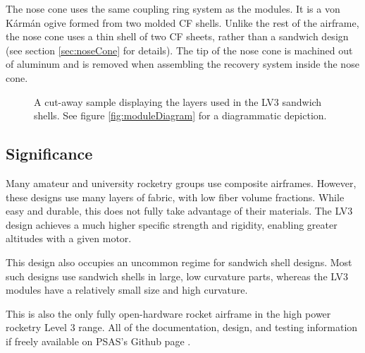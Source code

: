 \documentclass{aiaa-tc}%
\begin{document}
The nose cone uses the same coupling ring system as the modules. It is a von K\'arm\'an ogive formed from two molded CF shells. 
Unlike the rest of the airframe, the nose cone uses a thin shell of two CF sheets, rather than a sandwich design (see section \ref{sec:noseCone} for details). 
The tip of the nose cone is machined out of aluminum and is removed when assembling the recovery system inside the nose cone. 

\begin{figure}
\centering
\def\svgwidth{\linewidth}
\parbox{0.45\linewidth}{
	
	\caption{
		Diagram of the male end of a module. 
		The CF (1) is bonded to the honeycomb core (3) and the aluminum coupling ring (4) using structural adhesive (2). 
		The adhesive also serves as a protective coating for the CF and provides a smooth outer surface. 
		See figure \ref{fig:coupon} for a picture of this design.
		}
	\label{fig:moduleDiagram}
}
\hfill
\parbox{0.45\linewidth}{
	
	\caption{
		A cut-away sample displaying the layers used in the LV3 sandwich shells. 
		See figure \ref{fig:moduleDiagram} for a diagrammatic depiction.
		}
	\label{fig:coupon}
}
\end{figure}

\subsection{Significance}
Many amateur and university rocketry groups use composite airframes. However, these designs use many layers of fabric, with low fiber volume fractions.
While easy and durable, this does not fully take advantage of their materials. The LV3 design achieves a much higher specific strength and rigidity, enabling greater altitudes with a given motor. 

This design also occupies an uncommon regime for sandwich shell designs. Most such designs use sandwich shells in large, low curvature parts, whereas the LV3 modules have a relatively small size and high curvature.

This is also the only fully open-hardware rocket airframe in the high power rocketry Level 3 range. All of the documentation, design, and testing information if freely available on PSAS's Github page \cite{LV3repo}.
\end{document}

